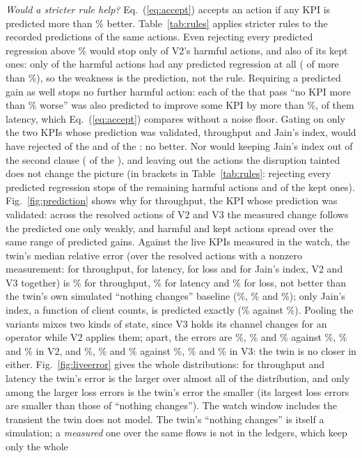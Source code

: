 \documentclass[conference]{IEEEtran}
\begin{document}
\emph{Would a stricter rule help?} Eq.~(\ref{eq:accept}) accepts an action if any KPI is predicted more than \CfgChangePct\% better. Table~\ref{tab:rules} applies stricter rules to the recorded predictions of the same actions. Even rejecting every predicted regression above \CfgChangePct\% would stop only \RuleNoRegHarm{} of V2's \HarmAll{} harmful actions, and also \RuleNoRegKept{} of its \KeptAll{} kept ones: only \HarmAnyRegress{} of the \HarmAll{} harmful actions had any predicted regression at all (\RuleNoRegHarm{} of more than \CfgChangePct\%), so the weakness is the prediction, not the rule. Requiring a predicted gain as well stops no further harmful action: each of the \HarmNoRegN{} that pass ``no KPI more than \CfgChangePct\% worse'' was also predicted to improve some KPI by more than \CfgChangePct\%, \HarmNoRegLatGain{} of them latency, which Eq.~(\ref{eq:accept}) compares without a noise floor. Gating on only the two KPIs whose prediction was validated, throughput and Jain's index, would have rejected \RuleThrJainHarm{} of the \HarmAll{} and \RuleThrJainKept{} of the \KeptAll{}: no better. Nor would keeping Jain's index out of the second clause (\RuleNoJainHarm{} of the \HarmAll{}), and leaving out the actions the disruption tainted does not change the picture (in brackets in Table~\ref{tab:rules}: rejecting every predicted regression stops \RuleNoRegHarmClear{} of the \HarmClearVtwo{} remaining harmful actions and \RuleNoRegKeptClear{} of the \KeptClearVtwo{} kept ones). Fig.~\ref{fig:prediction} shows why for throughput, the KPI whose prediction was validated: across the resolved actions of V2 and V3 the measured change follows the predicted one only weakly, and harmful and kept actions spread over the same range of predicted gains. Against the live KPIs measured in the watch, the twin's median relative error (over the resolved actions with a nonzero measurement: \LiveThrN{} for throughput, \LiveLatN{} for latency, \LiveLossN{} for loss and \LiveJainN{} for Jain's index, V2 and V3 together) is \LiveThrErr\% for throughput, \LiveLatErr\% for latency and \LiveLossErr\% for loss, not better than the twin's own simulated ``nothing changes'' baseline (\LiveThrBase\%, \LiveLatBase\% and \LiveLossBase\%); only Jain's index, a function of client counts, is predicted exactly (\LiveJainErr\% against \LiveJainBase\%). Pooling the variants mixes two kinds of state, since V3 holds its channel changes for an operator while V2 applies them; apart, the errors are \LiveVtwoThrErr\%, \LiveVtwoLatErr\% and \LiveVtwoLossErr\% against \LiveVtwoThrBase\%, \LiveVtwoLatBase\% and \LiveVtwoLossBase\% in V2, and \LiveVthreeThrErr\%, \LiveVthreeLatErr\% and \LiveVthreeLossErr\% against \LiveVthreeThrBase\%, \LiveVthreeLatBase\% and \LiveVthreeLossBase\% in V3: the twin is no closer in either. Fig.~\ref{fig:liveerror} gives the whole distributions: for throughput and latency the twin's error is the larger over almost all of the distribution, and only among the larger loss errors is the twin's error the smaller (its largest loss errors are smaller than those of ``nothing changes''). The watch window includes the transient the twin does not model. The twin's ``nothing changes'' is itself a simulation; a \emph{measured} one over the same flows is not in the ledgers, which keep only the whole 
\end{document}

